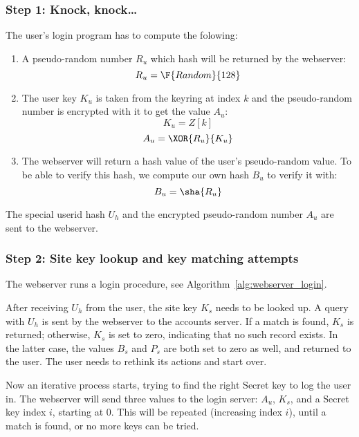 \subsubsection{Step 1: Knock, knock\ldots}
\label{sec:login_step1}
The user's login program has to compute the folowing:
\begin{enumerate}
\item A pseudo-random number $R_u$ which hash will be returned by the webserver:
\[R_u=\F{Random}{128}\]
\item The user key $K_u$ is taken from the keyring at index $k$ and the pseudo-random number is encrypted with it to get the value $A_u$:
\[K_u=Z[k]\]
\[A_u=\XOR{R_u}{K_u}\]
\item The webserver will return a hash value of the user's pseudo-random value.
To be able to verify this hash,
we compute our own hash $B_u$ to verify it with:
\[B_u=\sha{R_u}\]
\end{enumerate}
The special userid hash $U_h$ and the encrypted pseudo-random number $A_u$ are sent to the webserver.

\subsubsection{Step 2: Site key lookup and key matching attempts}
\label{sec:login_step2}
The webserver runs a login procedure,
see Algorithm~\vref{alg:webserver_login}.
\par
After receiving $U_h$ from the user, the site key $K_s$ needs to be looked up.
A query with $U_h$ is sent by the webserver to the accounts server.
If a match is found, $K_s$ is returned;
otherwise, $K_s$ is set to zero, indicating that no such record exists.
In the latter case, the values $B_s$ and $P_s$ are both set to zero as well, and returned to the user.
The user needs to rethink its actions and start over.
\par
Now an iterative process starts, trying to find the right Secret key to log the user in.
The webserver will send three values to the login server:
$A_u$,
$K_s$,
and a Secret key index $i$,
starting at 0.
This will be repeated
(increasing index $i$),
until a match is found,
or no more keys can be tried.

